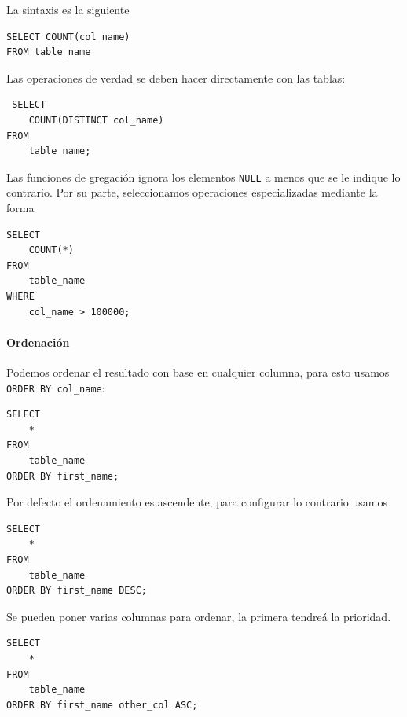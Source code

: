 La sintaxis es la siguiente
\begin{verbatim}
SELECT COUNT(col_name)
FROM table_name
\end{verbatim}
Las operaciones de verdad se deben hacer directamente con las tablas:

\begin{verbatim}
 SELECT
    COUNT(DISTINCT col_name)
FROM
    table_name;
\end{verbatim}
Las funciones de gregación ignora los elementos \texttt{NULL} a menos que se le indique lo contrario. Por su parte, seleccionamos operaciones especializadas mediante la forma

\begin{verbatim}
SELECT
    COUNT(*)
FROM 
    table_name
WHERE
    col_name > 100000;
\end{verbatim}
\paragraph{Ordenación} Podemos ordenar el resultado con base en cualquier columna, para esto usamos \texttt{ORDER BY col\_name}:

\begin{verbatim}
SELECT
    *
FROM
    table_name
ORDER BY first_name;
\end{verbatim} 
Por defecto el ordenamiento es ascendente, para configurar lo contrario usamos 

\begin{verbatim}
SELECT
    *
FROM
    table_name
ORDER BY first_name DESC;
\end{verbatim} 
Se pueden poner varias columnas para ordenar, la primera tendreá la prioridad.

\begin{verbatim}
SELECT
    *
FROM
    table_name
ORDER BY first_name other_col ASC;
\end{verbatim}
